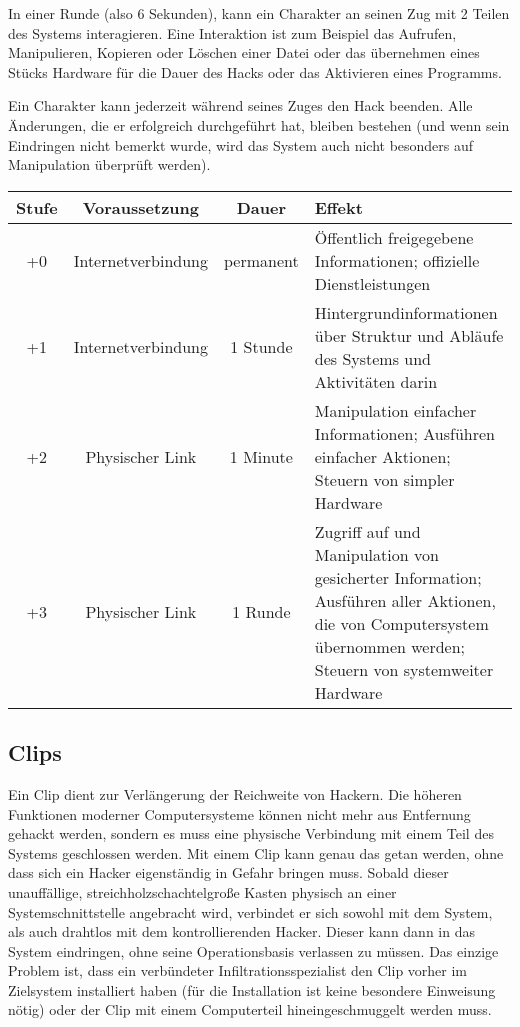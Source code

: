 In einer Runde (also 6 Sekunden), kann ein Charakter an seinen Zug mit 2 Teilen des Systems interagieren. Eine Interaktion ist zum Beispiel das Aufrufen, Manipulieren, Kopieren oder Löschen einer Datei oder das übernehmen eines Stücks Hardware für die Dauer des Hacks oder das Aktivieren eines Programms.

Ein Charakter kann jederzeit während seines Zuges den Hack beenden. Alle Änderungen, die er erfolgreich durchgeführt hat, bleiben bestehen (und wenn sein Eindringen nicht bemerkt wurde, wird das System auch nicht besonders auf Manipulation überprüft werden).
\begin{tabular}{c|c|c|p{3cm}}
Stufe & Voraussetzung & Dauer & Effekt \\		
\hline
+0 & Internetverbindung	& permanent & Öffentlich freigegebene Informationen; offizielle Dienstleistungen \\
+1 & Internetverbindung	& 1 Stunde	& Hintergrundinformationen über Struktur und Abläufe des Systems und Aktivitäten darin \\
+2 & Physischer Link & 1 Minute & Manipulation einfacher Informationen; Ausführen einfacher Aktionen; Steuern von simpler Hardware \\
+3 & Physischer Link & 1 Runde & Zugriff auf und Manipulation von gesicherter Information; Ausführen aller Aktionen, die von Computersystem übernommen werden; Steuern von systemweiter Hardware \\
\end{tabular}
\subsection{Clips}
Ein Clip dient zur Verlängerung der Reichweite von Hackern. Die höheren Funktionen moderner Computersysteme können nicht mehr aus Entfernung gehackt werden, sondern es muss eine physische Verbindung mit einem Teil des Systems geschlossen werden. Mit einem Clip kann genau das getan werden, ohne dass sich ein Hacker eigenständig in Gefahr bringen muss. Sobald dieser unauffällige, streichholzschachtelgroße Kasten physisch an einer Systemschnittstelle angebracht wird, verbindet er sich sowohl mit dem System, als auch drahtlos mit dem kontrollierenden Hacker. Dieser kann dann in das System eindringen, ohne seine Operationsbasis verlassen zu müssen. Das einzige Problem ist, dass ein verbündeter Infiltrationsspezialist den Clip vorher im Zielsystem installiert haben (für die Installation ist keine besondere Einweisung nötig) oder der Clip mit einem Computerteil hineingeschmuggelt werden muss.


